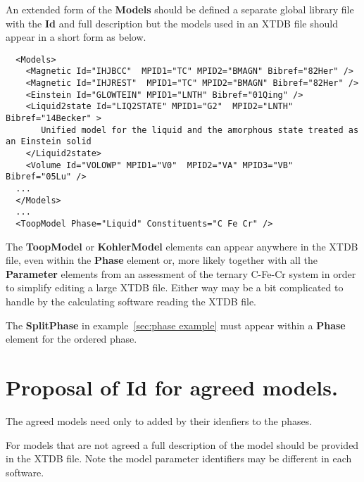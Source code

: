 \documentclass{article}
\begin{document}
\begin{appendices}
An extended form of the {\bf Models} should be defined a separate
global library file with the {\bf Id} and full description but the
models used in an XTDB file should appear in a short form as below.

{\small
\begin{verbatim}
  <Models>
    <Magnetic Id="IHJBCC"  MPID1="TC" MPID2="BMAGN" Bibref="82Her" />
    <Magnetic Id="IHJREST"  MPID1="TC" MPID2="BMAGN" Bibref="82Her" />
    <Einstein Id="GLOWTEIN" MPID1="LNTH" Bibref="01Qing" /> 
    <Liquid2state Id="LIQ2STATE" MPID1="G2"  MPID2="LNTH" Bibref="14Becker" >
       Unified model for the liquid and the amorphous state treated as an Einstein solid
    </Liquid2state>
    <Volume Id="VOLOWP" MPID1="V0"  MPID2="VA" MPID3="VB" Bibref="05Lu" />
  ...
  </Models>
  ...
  <ToopModel Phase="Liquid" Constituents="C Fe Cr" />
\end{verbatim}
}

The {\bf ToopModel} or {\bf KohlerModel} elements can appear anywhere
in the XTDB file, even within the {\bf Phase} element or, more likely
together with all the {\bf Parameter} elements from an assessment of
the ternary C-Fe-Cr system in order to simplify editing a large XTDB
file.  Either way may be a bit complicated to handle by the
calculating software reading the XTDB file.

The {\bf SplitPhase} in example~\ref{sec:phase example} must appear
within a {\bf Phase} element for the ordered phase.

\newpage
\section{Proposal of Id for agreed models.}\label{sec:modelapp}

The agreed models need only to added by their idenfiers to the phases.

For models that are not agreed a full description of the model should
be provided in the XTDB file.  Note the model parameter identifiers
may be different in each software.


\end{appendices}
\end{document}
